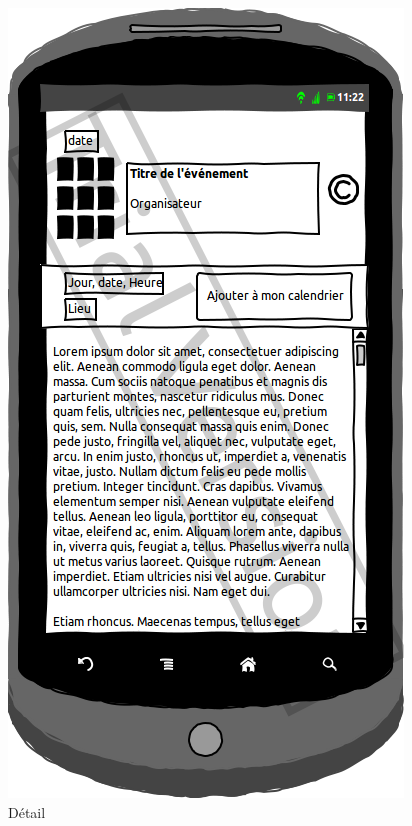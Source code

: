 \documentclass[a4paper, 11pt]{article}
\begin{document}
\begin{figure}[htbp]
\begin{minipage}[c]{.50\linewidth}
\begin{center}
			\includegraphics[scale=0.3]{../../Sketch/Android/DescrEvent.png}
		\end{center}
	\caption{Détail}
	\end{minipage}
\end{figure}
\end{document}

